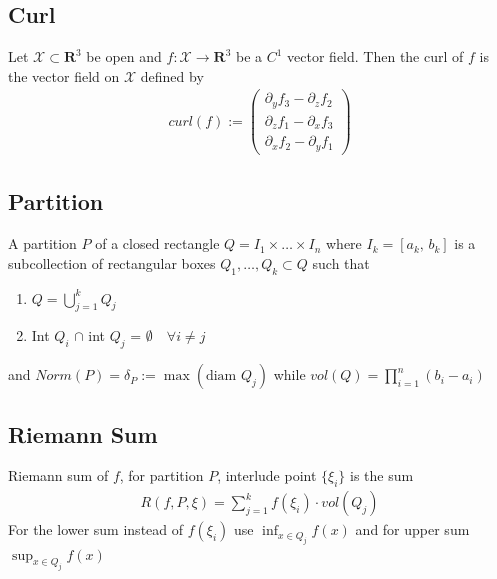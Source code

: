 \documentclass[8pt]{extarticle}
\newcommand{\R}{{\mathbb R}}
\newcommand{\X}{{\mathcal X}}
\newcommand{\ra}{{\rightarrow}}
\def\R{\mathbf{R}}
\begin{document}
\begin{multicols*}{3}
  \subsection{Curl}
  Let $\X \subset \R^3$ be open and $f: \X \ra \R^3$ be a $C^1$ vector field.
  Then the curl of $f$ is the vector field on $\X$ defined by
  \begin{align*}
    curl(f) :=
    \begin{pmatrix}
      \partial_y f_3 - \partial_z f_2 \\
      \partial_z f_1 - \partial_x f_3 \\
      \partial_x f_2 - \partial_y f_1
    \end{pmatrix}
  \end{align*}
  \subsection{Partition}
  A partition $P$ of a closed rectangle $Q = I_1 \times \dots \times I_n$
  where $I_k = [a_k,\, b_k]$ is a subcollection of rectangular boxes
  $Q_1, \dots, Q_k \subset Q$ such that
  \begin{enumerate}[label=(\arabic*)]
    \item $Q = \bigcup_{j = 1}^k Q_j$
    \item Int $Q_i$ $\cap$ int $Q_j$ = $\emptyset \quad \forall i \neq j$
  \end{enumerate}
  and $Norm(P) = \delta_P := \max(\text{diam } Q_j)$ while
  $vol(Q) = \prod_{i = 1}^n (b_i - a_i)$
  \subsection{Riemann Sum}
  Riemann sum of $f$, for partition $P$, interlude point $\{\xi_i\}$
  is the sum
  \begin{align*}
    R(f, P, \xi) = \sum_{j = 1}^k f(\xi_i) \cdot vol(Q_j)
  \end{align*}
  For the lower sum instead of $f(\xi_i)$ use $\inf_{x \in Q_j} f(x)$
  and for upper sum $\sup_{x \in Q_j} f(x)$\\ \\

\end{multicols*}
\end{document}
